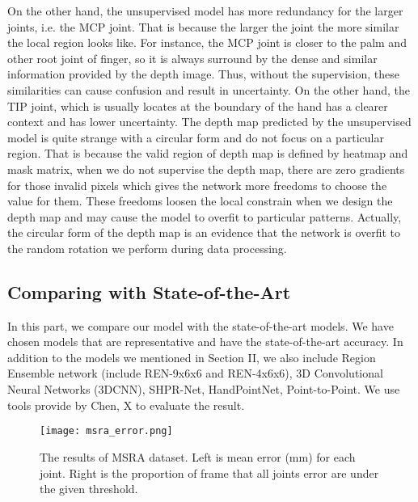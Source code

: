 \documentclass[journal]{IEEEtran}
\begin{document}
On the other hand, the unsupervised model has more redundancy for the larger joints, i.e. the MCP joint. 
That is because the larger the joint the more similar the local region looks like. 
For instance, the MCP joint is closer to the palm and other root joint of finger, so it is always surround by the dense and similar information provided by the depth image. 
Thus, without the supervision, these similarities can cause confusion and result in uncertainty. 
On the other hand, the TIP joint, which is usually locates at the boundary of the hand has a clearer context and has lower uncertainty. 
The depth map predicted by the unsupervised model is quite strange with a circular form and do not focus on a particular region. 
That is because the valid region of depth map is defined by heatmap and mask matrix, when we do not supervise the depth map, 
there are zero gradients for those invalid pixels which gives the network more freedoms to choose the value for them. 
These freedoms loosen the local constrain when we design the depth map and may cause the model to overfit to particular patterns. 
Actually, the circular form of the depth map is an evidence that the network is overfit to the random rotation we perform during data processing.

\subsection{Comparing with State-of-the-Art}

In this part, we compare our model with the state-of-the-art models. 
We have chosen models that are representative and have the state-of-the-art accuracy. 
In addition to the models we mentioned in Section II, we also include 
Region Ensemble network (include REN-9x6x6\cite{wang2018region} and REN-4x6x6\cite{guo2017region}), 
3D Convolutional Neural Networks (3DCNN\cite{ge20173d}), 
SHPR-Net\cite{chen2018shpr}, 
HandPointNet\cite{ge2018hand}, 
Point-to-Point\cite{ge2018point}. 
We use tools provide by Chen, X\cite{chen2017pose} to evaluate the result.   

\begin{figure*}[!t]
  \centering
  \texttt{[image: msra\_error.png]}
  \caption{
    The results of MSRA dataset. 
    Left is mean error (mm) for each joint. 
    Right is the proportion of frame that all joints error are under the given threshold.
  }
  \label{msra_error}
\end{figure*}
\end{document}
